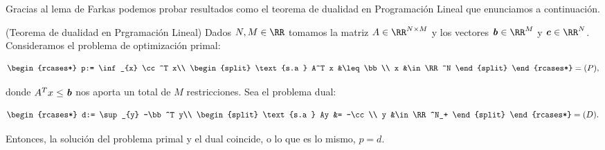 Gracias al lema de Farkas podemos probar resultados como el teorema de dualidad en Programación Lineal que enunciamos a continuación.
\begin{teoremaBox}(Teorema de dualidad en Prgramación Lineal)
Dados $ N,M \in \RR $ tomamos la matriz $ A \in \RR^{N\times M} $ y los vectores $ \bb \in \RR^M $ y $ \cc \in \RR^N $. Consideramos el problema de optimización primal:

\begin{equation*}\label{primal}
\begin{rcases*}
p:= \inf_{x} \cc^T x\\
\begin{split}
\text{s.a } A^T x &\leq \bb \\
x &\in \RR^N
\end{split}
\end{rcases*} = (P),
\end{equation*}

donde $ A^T x \leq \textbf{\emph{b}} $ nos aporta un total de $ M $ restricciones. Sea el problema dual:

\begin{equation*}\label{dual}
\begin{rcases*}
d:= \sup_{y} -\bb^T y\\
\begin{split}
\text{s.a } Ay &= -\cc \\
y &\in \RR^N_+
\end{split}
\end{rcases*} = (D).
\end{equation*}

Entonces, la solución del problema primal y el dual coincide, o lo que es lo mismo, $ p = d $.
\end{teoremaBox}
